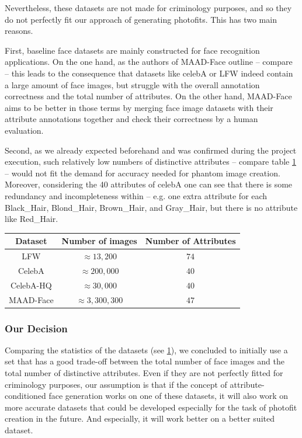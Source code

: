 \documentclass[12pt, a4paper]{article}
\begin{document}
Nevertheless, these datasets are not made for criminology purposes, and so they do not perfectly fit our approach of
generating photofits. This has two main reasons.

First, baseline face datasets are mainly constructed for face recognition applications. On the one hand, as the authors
of MAAD-Face outline -- compare \cite{DBLP2} -- this leads to the consequence that datasets like
celebA or LFW indeed contain a large amount of face images, but struggle with the overall annotation correctness and the total number of attributes.
On the other hand, MAAD-Face aims to be better in those terms by merging
face image datasets with their attribute annotations together and check their correctness by a human evaluation.

Second, as we already expected beforehand and was confirmed during the project execution, such relatively low numbers of
distinctive attributes -- compare table \ref{tab:dataset-stats} -- would not fit the demand for accuracy needed for phantom image creation.
Moreover, considering the 40 attributes of celebA one can see that
there is some redundancy and incompleteness within -- e.g. one extra attribute for each Black\_Hair, Blond\_Hair,
Brown\_Hair, and Gray\_Hair, but there is no attribute like  Red\_Hair.

\begin{table}[h]
\centering
    \begin{tabular}{|c|c|c|}
        \hline
        Dataset & Number of images & Number of Attributes \\
        \hline
        LFW & $\approx 13,200$ & $74$ \\
        CelebA & $\approx 200,000$ & $40$ \\
        CelebA-HQ & $\approx 30,000$ & $40$ \\
        MAAD-Face & $\approx 3,300,300$ & $47$ \\
        \hline
    \end{tabular}
    \label{tab:dataset-stats}
\end{table}

\subsubsection{Our Decision}
Comparing the statistics of the datasets (see \ref{tab:dataset-stats}), we concluded to initially use a set that has a good trade-off
between the total number of face images and the total number of distinctive attributes. Even if they are not perfectly
fitted for criminology purposes, our assumption is that if the concept of attribute-conditioned face generation works on
one of these datasets, it will also work on more accurate datasets that could be developed especially for the task of
photofit creation in the future. And especially, it will work better on a better suited dataset.
\end{document}
